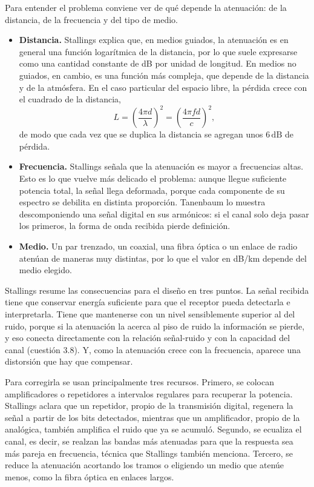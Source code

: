 \documentclass[11pt,a4paper]{article}
\begin{document}
Para entender el problema conviene ver de qué depende la atenuación: de la distancia, de la frecuencia y del tipo de medio.
\begin{itemize}
  \item \textbf{Distancia.} Stallings explica que, en medios guiados, la atenuación es en general una función logarítmica de la distancia, por lo que suele expresarse como una cantidad constante de dB por unidad de longitud. En medios no guiados, en cambio, es una función más compleja, que depende de la distancia y de la atmósfera. En el caso particular del espacio libre, la pérdida crece con el cuadrado de la distancia,
  \[
    L=\left(\frac{4\pi d}{\lambda}\right)^{2}=\left(\frac{4\pi f d}{c}\right)^{2},
  \]
  de modo que cada vez que se duplica la distancia se agregan unos $6\,\mathrm{dB}$ de pérdida.
  \item \textbf{Frecuencia.} Stallings señala que la atenuación es mayor a frecuencias altas. Esto es lo que vuelve más delicado el problema: aunque llegue suficiente potencia total, la señal llega deformada, porque cada componente de su espectro se debilita en distinta proporción. Tanenbaum lo muestra descomponiendo una señal digital en sus armónicos: si el canal solo deja pasar los primeros, la forma de onda recibida pierde definición.
  \item \textbf{Medio.} Un par trenzado, un coaxial, una fibra óptica o un enlace de radio atenúan de maneras muy distintas, por lo que el valor en dB/km depende del medio elegido.
\end{itemize}

Stallings resume las consecuencias para el diseño en tres puntos. La señal recibida tiene que conservar energía suficiente para que el receptor pueda detectarla e interpretarla. Tiene que mantenerse con un nivel sensiblemente superior al del ruido, porque si la atenuación la acerca al piso de ruido la información se pierde, y eso conecta directamente con la relación señal-ruido y con la capacidad del canal (cuestión 3.8). Y, como la atenuación crece con la frecuencia, aparece una distorsión que hay que compensar.

Para corregirla se usan principalmente tres recursos. Primero, se colocan amplificadores o repetidores a intervalos regulares para recuperar la potencia. Stallings aclara que un repetidor, propio de la transmisión digital, regenera la señal a partir de los bits detectados, mientras que un amplificador, propio de la analógica, también amplifica el ruido que ya se acumuló. Segundo, se ecualiza el canal, es decir, se realzan las bandas más atenuadas para que la respuesta sea más pareja en frecuencia, técnica que Stallings también menciona. Tercero, se reduce la atenuación acortando los tramos o eligiendo un medio que atenúe menos, como la fibra óptica en enlaces largos.
\end{document}
